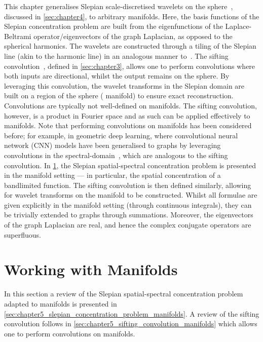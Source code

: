 This chapter generalises Slepian scale-discretised wavelets on the sphere~\cite{Roddy2021a}, discussed in \cref{sec:chapter4}, to arbitrary manifolds.
Here, the basis functions of the Slepian concentration problem are built from the eigenfunctions of the Laplace-Beltrami operator/eigenvectors of the graph Laplacian, as opposed to the spherical harmonics.
The wavelets are constructed through a tiling of the Slepian line (akin to the harmonic line) in an analogous manner to~\cite{Wiaux2008,McEwen2018}.
The sifting convolution~\cite{Roddy2021}, defined in \cref{sec:chapter3}, allows one to perform convolutions where both inputs are directional, whilst the output remains on the sphere.
By leveraging this convolution, the wavelet transforms in the Slepian domain are built on a region of the sphere (\cf{} manifold) to ensure exact reconstruction.
Convolutions are typically not well-defined on manifolds.
The sifting convolution, however, is a product in Fourier space and as such can be applied effectively to manifolds.
Note that performing convolutions on manifolds has been considered before; for example, in geometric deep learning, where convolutional neural network (CNN) models have been generalised to graphs by leveraging convolutions in the spectral-domain~\cite{Bruna2014,Henaff2015,Defferrard2016}, which are analogous to the sifting convolution.
In \cref{sec:chapter5_working_with_manifolds}, the Slepian spatial-spectral concentration problem is presented in the manifold setting --- in particular, the spatial concentration of a bandlimited function.
The sifting convolution is then defined similarly, allowing for wavelet transforms on the manifold to be constructed.
Whilst all formulae are given explicitly in the manifold setting (through continuous integrals), they can be trivially extended to graphs through summations.
Moreover, the eigenvectors of the graph Laplacian are real, and hence the complex conjugate operators are superfluous.

\section{Working with Manifolds}\label{sec:chapter5_working_with_manifolds}

In this section a review of the Slepian spatial-spectral concentration problem adapted to manifolds is presented in \cref{sec:chapter5_slepian_concentration_problem_manifolds}.
A review of the sifting convolution follows in \cref{sec:chapter5_sifting_convolution_manifolds} which allows one to perform convolutions on manifolds.


